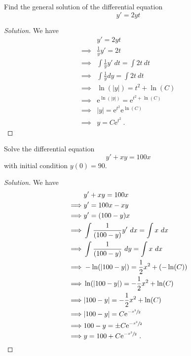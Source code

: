 \documentclass[compacto,10pt,comentarios]{aleph-notas}
\begin{document}
\begin{ejer}
    Find the general solution of the differential equation
    $$
        y' = 2yt
    $$
\end{ejer}
\begin{proof}[Solution]
    We have
    \begin{align*}
                 &  y' = 2yt  \\
        \implies & \frac{1}{y}y' = 2t \\ 
        \implies & \int \frac{1}{y} y' ~ dt = \int 2t ~ dt \\ 
        \implies & \int \frac{1}{y} dy = \int 2t ~ dt \\ 
        \implies & \ln(|y|) = t^{2} + \ln(C) \\ 
        \implies & \mathrm{e}^{\ln(|y|)} = \mathrm{e}^{t^{2} + \ln(C)} \\ 
        \implies & |y| = \mathrm{e}^{t^{2}} \mathrm{e}^{\ln(C)} \\ 
        \implies & y = C \mathrm{e}^{t^{2}} ~ . 
    \end{align*}
\end{proof}

\begin{ejer}
    Solve the differential equation
    $$
        y' + xy = 100x
    $$
    with initial condition $y(0) = 90$. 
\end{ejer}
\begin{proof}[Solution]
    We have
    \begin{align*}
                 &  y' + xy = 100x  \\
        \implies & y' = 100x - xy \\ 
        \implies & y' = (100 - y)x \\
        \implies & \int \frac{1}{(100 - y)} y' ~ dx = \int x ~ dx \\ 
        \implies & \int \frac{1}{(100 - y)} ~ dy = \int x ~ dx \\ 
        \implies & -\ln(|100 - y|) = \frac{1}{2}x^{2} + (-\ln(C)) \\ 
        \implies & \ln(|100 - y|) = - \frac{1}{2}x^{2} + \ln(C) \\  
        \implies & |100 - y| = - \frac{1}{2}x^{2} + \ln(C) \\  
        \implies & |100 - y| = C \mathrm{e}^{-\sfrac{x^2}{2}} \\
        \implies & 100 - y = \pm C \mathrm{e}^{-\sfrac{x^2}{2}} \\
        \implies & y = 100 +  C \mathrm{e}^{-\sfrac{x^2}{2}} ~ .
    \end{align*}
\end{proof}
\end{document}
